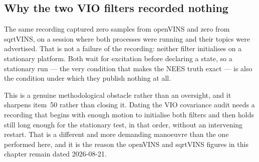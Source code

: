 \subsection{Why the two VIO filters recorded nothing}

The same recording captured zero samples from openVINS and zero from
sqrtVINS, on a session where both processes were running and their topics
were advertised. That is not a failure of the recording: neither filter
initialises on a stationary platform. Both wait for excitation before
declaring a state, so a stationary run --- the very condition that makes
the NEES truth exact --- is also the condition under which they publish
nothing at all.

This is a genuine methodological obstacle rather than an oversight, and it
sharpens item~50 rather than closing it. Dating the VIO covariance audit
needs a recording that begins with enough motion to initialise both filters
and then holds still long enough for the stationary test, in that order,
without an intervening restart. That is a different and more demanding
manoeuvre than the one performed here, and it is the reason the openVINS and
sqrtVINS figures in this chapter remain dated 2026-08-21.
